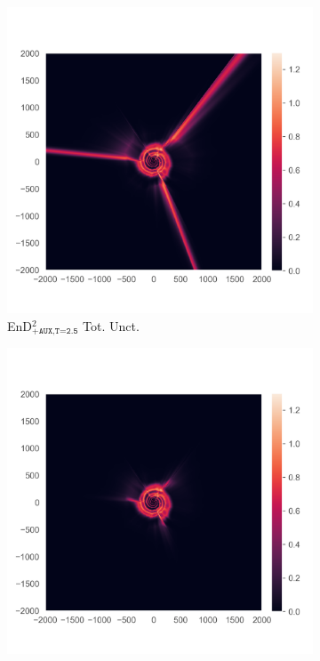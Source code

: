 \begin{figure}
\begin{subfigure}{0.22\textwidth}
  \centering
  \includegraphics[trim=42 45 15 55, clip, width=\linewidth]{../openreview/plots/3m.png}
  \caption{EnD$^2_{\texttt{+AUX,T=2.5}}$ Tot. Unct.}
  \label{fig:3m}
\end{subfigure}%
\begin{subfigure}{0.22\textwidth}
  \centering
  \includegraphics[trim=42 45 15 55, clip, width=\linewidth]{../openreview/plots/3n.png}

\end{subfigure}
\end{figure}
